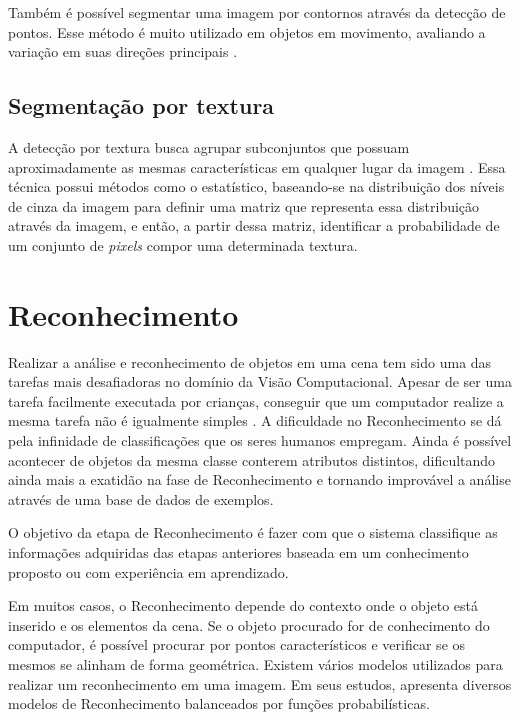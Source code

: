 Também é possível segmentar uma imagem por contornos através da detecção de pontos. Esse método é muito utilizado em objetos em movimento, avaliando a variação em suas direções principais \cite{ANTUNES}.

\subsection{Segmentação por textura}

A detecção por textura busca agrupar subconjuntos que possuam aproximadamente as mesmas características em qualquer lugar da imagem \cite{ANTUNES}. Essa técnica possui métodos como o estatístico, baseando-se na distribuição dos níveis de cinza da imagem para definir uma matriz que representa essa distribuição através da imagem, e então, a partir dessa matriz, identificar a probabilidade de um conjunto de \textit{pixels} compor uma determinada textura.

\section{Reconhecimento}

Realizar a análise e reconhecimento de objetos em uma cena tem sido uma das tarefas mais desafiadoras no domínio da Visão Computacional. Apesar de ser uma tarefa facilmente executada por crianças, conseguir que um computador realize a mesma tarefa não é igualmente simples \cite{SZELISKI}. A dificuldade no Reconhecimento se dá pela infinidade de classificações que os seres humanos empregam. Ainda é possível acontecer de objetos da mesma classe conterem atributos distintos, dificultando ainda mais a exatidão na fase de Reconhecimento e tornando improvável a análise através de uma base de dados de exemplos.

O objetivo da etapa de Reconhecimento é fazer com que o sistema classifique as informações adquiridas das etapas anteriores baseada em um conhecimento proposto ou com experiência em aprendizado.

Em muitos casos, o Reconhecimento depende do contexto onde o objeto está inserido e os elementos da cena. Se o objeto procurado for de conhecimento do computador, é possível procurar por pontos característicos e verificar se os mesmos se alinham de forma geométrica. Existem vários modelos utilizados para realizar um reconhecimento em uma imagem. Em seus estudos,  apresenta diversos modelos de Reconhecimento balanceados por funções probabilísticas.

